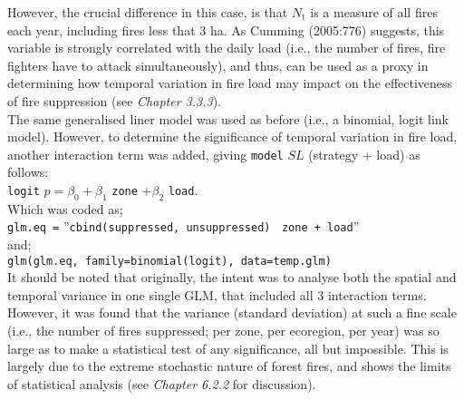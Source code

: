 \begin{spacing}{1.5}
\noindent However, the crucial difference in this case, is that $N_{\mathrm{t}}$ is a measure of all fires each year, including fires less that 3 ha. As Cumming (2005:776) suggests, this variable is strongly correlated with the daily load (i.e., the number of fires, fire fighters have to attack simultaneously), and thus, can be used as a proxy in determining how temporal variation in fire load may impact on the effectiveness of fire suppression (see \emph{Chapter 3.3.3}). \\

\noindent The same generalised liner model was used as before (i.e., a binomial, logit link model). However, to determine the significance of temporal variation in fire load, another interaction term was added, giving \texttt{model} $SL$ (strategy + load) as follows: \\

\texttt{logit} $p = {\beta}_{0} + {\beta}_{1}$ \texttt{zone} $+ {\beta}_{2}$ \texttt{load}. \\

\noindent Which was coded as; \\

\texttt{glm.eq =} ''\texttt{cbind(suppressed, unsuppressed)} $~$ \texttt{zone + load}'' \\

\noindent and; \\

\texttt{glm(glm.eq, family=binomial(logit), data=temp.glm) }\\

\noindent It should be noted that originally, the intent was to analyse both the spatial and temporal variance in one single GLM, that included all 3 interaction terms. However, it was found that the variance (standard deviation) at such a fine scale (i.e., the number of fires suppressed; per zone, per ecoregion, per year) was so large as to make a statistical test of any significance, all but impossible. This is largely due to the extreme stochastic nature of forest fires, and shows the limits of statistical analysis (see \emph{Chapter 6.2.2} for discussion).

\end{spacing}
\clearpage
